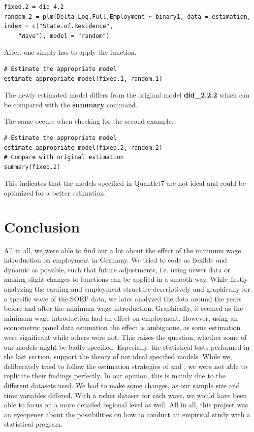 \documentclass[a4paper]{article}
\begin{document}
{\begin{lstlisting}
fixed.2 = did_4.2
random.2 = plm(Delta.Log.Full.Employment ~ binary1, data = estimation, 
index = c("State.of.Residence", 
    "Wave"), model = "random")
\end{lstlisting}
After, one simply has to apply the function.
\begin{lstlisting}
# Estimate the appropriate model
estimate_appropriate_model(fixed.1, random.1)
\end{lstlisting}
 The newly estimated model differs from the original model \textbf{did\_2.2.2} which can be compared with the \textbf{summary} command.

The same occurs when checking for the second example.
\begin{lstlisting}
# Estimate the appropriate model
estimate_appropriate_model(fixed.2, random.2)
# Compare with original estimation
summary(fixed.2)
\end{lstlisting}
This indicates that the models specified in Quantlet7 are not ideal and could be optimized for a better estimation.

\section{Conclusion}
All in all, we were able to find out a lot about the effect of the minimum wage introduction on employment in Germany. We tried to code as flexible and dynamic as possible, such that future adjustments, i.e. using newer data or making slight changes to functions can be applied in a smooth way. While firstly analyzing the earning and employment structure descriptively and graphically for a specific wave of the SOEP data, we later analyzed the data around the years before and after the minimum wage introduction. Graphically, it seemed as the minimum wage introduction had an effect on employment. However, using an econometric panel data estimation the effect is ambiguous, as some estimation were significant while others were not. This raises the question, whether some of our models might be badly specified. Especially, the statistical tests performed in the last section, support the theory of not ideal specified models. While we, deliberately tried to follow the estimation strategies of \cite{schmitz2017effects} and \cite{caliendo2017short}, we were not able to replicate their findings perfectly. In our opinion, this is mainly due to the different datasets used. We had to make some changes, as our sample size and time variables differed. With a richer dataset for each wave, we would have been able to focus on a more detailed regional level as well. All in all, this project was an eyeopener about the possibilities on how to conduct an empirical study with a statistical program.
\newpage
}
\end{document}
